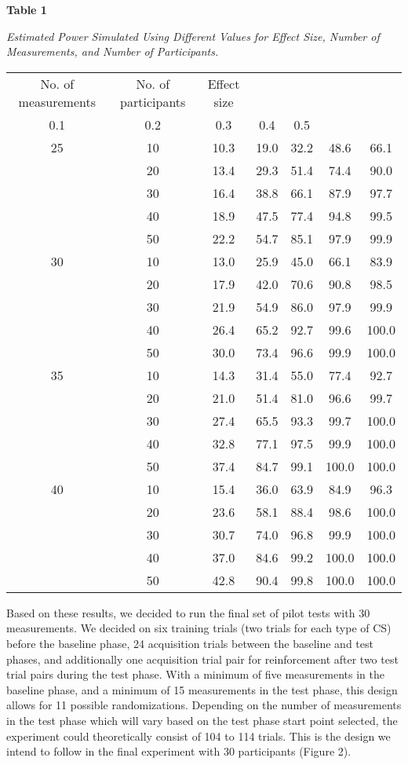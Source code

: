 \documentclass{article}
\begin{document}
\textbf{Table 1}

\emph{Estimated Power Simulated Using Different Values for Effect Size, Number of Measurements, and Number of Participants.}


\begin{table}

  
\begin{tabular}{c  c  c  c  c  c  c}

  No. of measurements & No. of participants & Effect size\\
0.1 & 0.2 & 0.3 & 0.4 & 0.5\\
25 & 10 & 10.3 & 19.0 & 32.2 & 48.6 & 66.1\\
  & 20 & 13.4 & 29.3 & 51.4 & 74.4 & 90.0\\
  & 30 & 16.4 & 38.8 & 66.1 & 87.9 & 97.7\\
  & 40 & 18.9 & 47.5 & 77.4 & 94.8 & 99.5\\
  & 50 & 22.2 & 54.7 & 85.1 & 97.9 & 99.9\\
30 & 10 & 13.0 & 25.9 & 45.0 & 66.1 & 83.9\\
  & 20 & 17.9 & 42.0 & 70.6 & 90.8 & 98.5\\
  & 30 & 21.9 & 54.9 & 86.0 & 97.9 & 99.9\\
  & 40 & 26.4 & 65.2 & 92.7 & 99.6 & 100.0\\
  & 50 & 30.0 & 73.4 & 96.6 & 99.9 & 100.0\\
35 & 10 & 14.3 & 31.4 & 55.0 & 77.4 & 92.7\\
  & 20 & 21.0 & 51.4 & 81.0 & 96.6 & 99.7\\
  & 30 & 27.4 & 65.5 & 93.3 & 99.7 & 100.0\\
  & 40 & 32.8 & 77.1 & 97.5 & 99.9 & 100.0\\
  & 50 & 37.4 & 84.7 & 99.1 & 100.0 & 100.0\\
40 & 10 & 15.4 & 36.0 & 63.9 & 84.9 & 96.3\\
  & 20 & 23.6 & 58.1 & 88.4 & 98.6 & 100.0\\
  & 30 & 30.7 & 74.0 & 96.8 & 99.9 & 100.0\\
  & 40 & 37.0 & 84.6 & 99.2 & 100.0 & 100.0\\
  & 50 & 42.8 & 90.4 & 99.8 & 100.0 & 100.0\\


\end{tabular}


\end{table}


Based on these results, we decided to run the final set of pilot tests with 30 measurements. We decided on six training trials (two trials for each type of CS) before the baseline phase, 24 acquisition trials between the baseline and test phases, and additionally one acquisition trial pair for reinforcement after two test trial pairs during the test phase. With a minimum of five measurements in the baseline phase, and a minimum of 15 measurements in the test phase, this design allows for 11 possible randomizations. Depending on the number of measurements in the test phase which will vary based on the test phase start point selected, the experiment could theoretically consist of 104 to 114 trials. This is the design we intend to follow in the final experiment with 30 participants (Figure 2).
\end{document}
